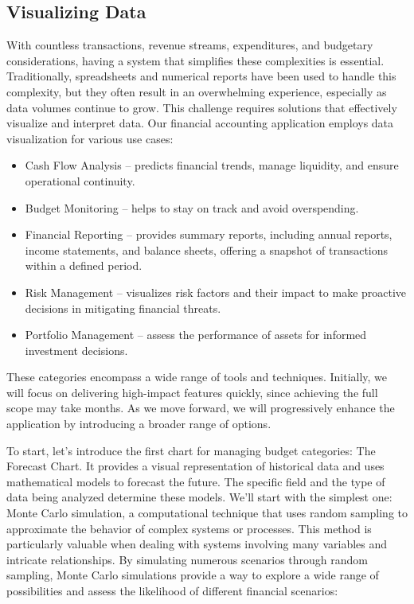 
\subsection{Visualizing Data}

With countless transactions, revenue streams, expenditures, and budgetary considerations, having a system that 
simplifies these complexities is essential. Traditionally, spreadsheets and numerical reports have been used to handle 
this complexity, but they often result in an overwhelming experience, especially as data volumes continue to grow.  This 
challenge requires solutions that effectively visualize and interpret data. Our financial accounting application employs 
data visualization for various use cases:

\begin{itemize}
  \item Cash Flow Analysis -- predicts financial trends, manage liquidity, and ensure operational continuity.

  \item Budget Monitoring -- helps to stay on track and avoid overspending.

  \item Financial Reporting -- provides summary reports, including annual reports, income statements, and balance 
  sheets, offering a snapshot of transactions within a defined period.

  \item Risk Management -- visualizes risk factors and their impact to make proactive decisions in mitigating financial 
  threats.

  \item Portfolio Management -- assess the performance of assets for informed investment decisions.
\end{itemize}

\noindent These categories encompass a wide range of tools and techniques. Initially, we will focus on delivering 
high-impact features quickly, since achieving the full scope may take months. As we move forward, we will progressively 
enhance the application by introducing a broader range of options.

To start, let's introduce the first chart for managing budget categories: The Forecast Chart. It provides a visual 
representation of historical data and uses mathematical models to forecast the future. The specific field and the type 
of data being analyzed determine these models. We'll start with the simplest one: Monte Carlo simulation, a 
computational technique that uses random sampling to approximate the behavior of complex systems or processes. This 
method is particularly valuable when dealing with systems involving many variables and intricate relationships. By 
simulating numerous scenarios through random sampling, Monte Carlo simulations provide a way to explore a wide range of 
possibilities and assess the likelihood of different financial scenarios:

